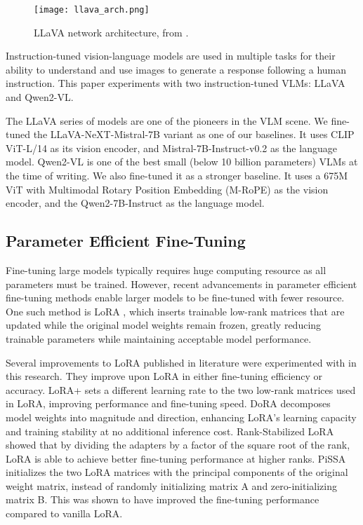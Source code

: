 \begin{figure}[!h]
  \centering
  \texttt{[image: llava\_arch.png]}
  \caption{LLaVA network architecture, from \cite{liu2023llava}.}
\end{figure}

\par
Instruction-tuned vision-language models are used in multiple tasks for their ability to understand and use images to generate a response following a human instruction. This paper experiments with two instruction-tuned VLMs: LLaVA\cite{liu2023llava} and Qwen2-VL\cite{qwen2vl}.
\\
\par
The LLaVA series of models are one of the pioneers in the VLM scene. We fine-tuned the LLaVA-NeXT-Mistral-7B variant as one of our baselines. It uses CLIP ViT-L/14\cite{clip} as its vision encoder, and Mistral-7B-Instruct-v0.2\cite{jiang2023mistral} as the language model. Qwen2-VL\cite{qwen2vl} is one of the best small (below 10 billion parameters) VLMs at the time of writing. We also fine-tuned it as a stronger baseline. It uses a 675M ViT with Multimodal Rotary Position Embedding (M-RoPE) as the vision encoder, and the Qwen2-7B-Instruct\cite{qwen2lm} as the language model.

\subsection{Parameter Efficient Fine-Tuning}
Fine-tuning large models typically requires huge computing resource as all parameters must be trained. However, recent advancements in parameter efficient fine-tuning methods enable larger models to be fine-tuned with fewer resource. One such method is LoRA \cite{hu2021lora}, which inserts trainable low-rank matrices that are updated while the original model weights remain frozen, greatly reducing trainable parameters while maintaining acceptable model performance.
\\
\par
Several improvements to LoRA published in literature were experimented with in this research. They improve upon LoRA in either fine-tuning efficiency or accuracy. LoRA+\cite{lora_plus} sets a different learning rate to the two low-rank matrices used in LoRA, improving performance and fine-tuning speed. DoRA\cite{dora} decomposes model weights into magnitude and direction, enhancing LoRA's learning capacity and training stability at no additional inference cost. Rank-Stabilized LoRA\cite{rslora} showed that by dividing the adapters by a factor of the square root of the rank, LoRA is able to achieve better fine-tuning performance at higher ranks. PiSSA\cite{pissa} initializes the two LoRA matrices with the principal components of the original weight matrix, instead of randomly initializing matrix A and zero-initializing matrix B. This was shown to have improved the fine-tuning performance compared to vanilla LoRA.